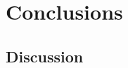 \documentclass[USenglish]{uit-thesis}
\begin{document}
\chapter{Conclusions}
\label{chap:conclusion}

\section{Discussion}
\label{sec:discussion}
%
\end{document}
